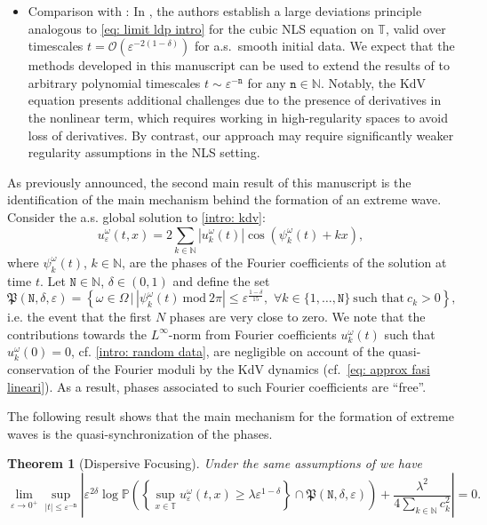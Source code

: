 \documentclass[a4paper,10pt,reqno]{article}
\theoremstyle{definition}
\theoremstyle{plain}
\newtheorem{theorem}[definition]{Theorem}
\theoremstyle{plain}
\theoremstyle{definition}
\theoremstyle{plain}
\theoremstyle{plain}
\theoremstyle{plain}
\theoremstyle{definition}
\theoremstyle{definition}
\def \N{\mathbb N}
\def \P{{\mathbb P}}
\def \T{\mathbb{T}}
\def \tn{\mathtt{n}}
\def \tN{\mathtt{N}}
\begin{document}
\begin{itemize}
    \item[5.] {\sc Comparison with \cite{grande}}: In \cite{grande}, the authors establish a large deviations principle analogous to \eqref{eq: limit ldp intro} for the cubic NLS equation on $\T$, valid over timescales $t = \mathcal{O}(\varepsilon^{-2(1-\delta)})$ for a.s.~smooth initial data. We expect that the methods developed in this manuscript can be used to extend the results of \cite{grande} to arbitrary polynomial timescales $t \sim \varepsilon^{-\tn}$ for any $\tn \in \N$. Notably, the KdV equation presents additional challenges due to the presence of derivatives in the nonlinear term, which requires working in high-regularity spaces to avoid loss of derivatives. By contrast, our approach may require significantly weaker regularity assumptions in the NLS setting.
\end{itemize}

As previously announced, the second main result of this manuscript is the identification of the main mechanism behind the formation of an extreme wave.
Consider the a.s. global solution to \eqref{intro: kdv}:
\begin{equation} \label{intro: exact solution}
u_{\varepsilon}^{\omega}(t,x) = 2 \sum_{k \in \N} |u_k^{\omega}(t)| \cos\left(\psi_k^{\omega}(t)+ kx\right),
\end{equation}
where $\psi_k^{\omega}(t)$, $k \in \N$, are the phases of the Fourier coefficients of the solution at time $t$. Let $\tN \in \N$, $\delta\in (0,1)$ and define the set 
\begin{equation} \label{intro: fasi piccole}
\mathfrak{P}(\tN,\delta,\varepsilon) = \left \{ \omega \in \Omega \, | \, \left \lvert \psi_k^{\omega}(t) \ \mbox{mod}\ 2\pi \right \rvert \le \varepsilon^{ \frac{1-\delta}{15}}, \, \, \forall k \in \{1,\ldots, \tN\}\ \mbox{such that}\ c_k>0\right \},  
\end{equation}
i.e. the event that the first $N$ phases are very close to zero. We note that the contributions towards the $L^{\infty}$-norm from Fourier coefficients $u_k^{\omega}(t)$ such that $u_k^{\omega}(0)=0$, cf. \eqref{intro: random data}, are negligible on account of the quasi-conservation of the Fourier moduli by the KdV dynamics (cf.~\eqref{eq: approx fasi lineari}). As a result, phases associated to such Fourier coefficients are ``free''.

The following result shows that the main mechanism for the formation of extreme waves is the quasi-synchronization of the phases.

\begin{theorem}[Dispersive Focusing] \label{thm: intro dispersive focusing}
Under the same assumptions of  we have 
\begin{equation} \label{intro: dispersive focusing}
\lim_{\varepsilon\to 0^{+}} \sup_{|t|\leq \varepsilon^{-\tn}} \left \lvert  \varepsilon^{2\delta} \log \P \left( \left \{ \sup_{x \in \T} u_{\varepsilon}^{\omega}(t,x) \ge \lambda \varepsilon^{1-\delta} \right \} \cap \mathfrak{P}(\tN,\delta,\varepsilon) \right) + \frac{\lambda^2}{4 \sum_{k\in\N} c_k^2} \right \rvert = 0.
\end{equation}
\end{theorem}
\end{document}

